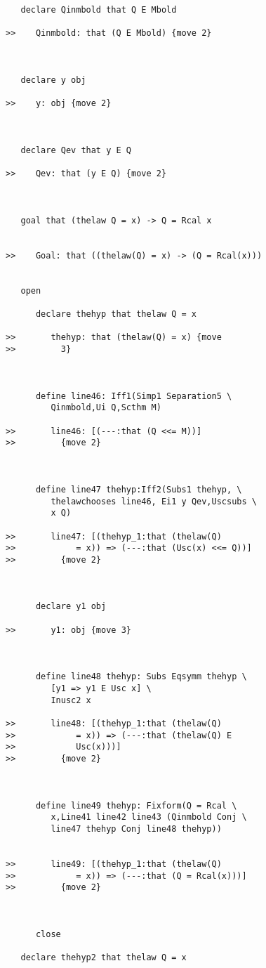 \documentclass[12pt]{article}
\begin{document}
\begin{verbatim}
   declare Qinmbold that Q E Mbold

>>    Qinmbold: that (Q E Mbold) {move 2}



   declare y obj

>>    y: obj {move 2}



   declare Qev that y E Q

>>    Qev: that (y E Q) {move 2}



   goal that (thelaw Q = x) -> Q = Rcal x


>>    Goal: that ((thelaw(Q) = x) -> (Q = Rcal(x)))


   open

      declare thehyp that thelaw Q = x

>>       thehyp: that (thelaw(Q) = x) {move
>>         3}



      define line46: Iff1(Simp1 Separation5 \
         Qinmbold,Ui Q,Scthm M)

>>       line46: [(---:that (Q <<= M))]
>>         {move 2}



      define line47 thehyp:Iff2(Subs1 thehyp, \
         thelawchooses line46, Ei1 y Qev,Uscsubs \
         x Q)

>>       line47: [(thehyp_1:that (thelaw(Q)
>>            = x)) => (---:that (Usc(x) <<= Q))]
>>         {move 2}



      declare y1 obj

>>       y1: obj {move 3}



      define line48 thehyp: Subs Eqsymm thehyp \
         [y1 => y1 E Usc x] \
         Inusc2 x

>>       line48: [(thehyp_1:that (thelaw(Q)
>>            = x)) => (---:that (thelaw(Q) E
>>            Usc(x)))]
>>         {move 2}



      define line49 thehyp: Fixform(Q = Rcal \
         x,Line41 line42 line43 (Qinmbold Conj \
         line47 thehyp Conj line48 thehyp))


>>       line49: [(thehyp_1:that (thelaw(Q)
>>            = x)) => (---:that (Q = Rcal(x)))]
>>         {move 2}



      close

   declare thehyp2 that thelaw Q = x


\end{verbatim}
\end{document}
